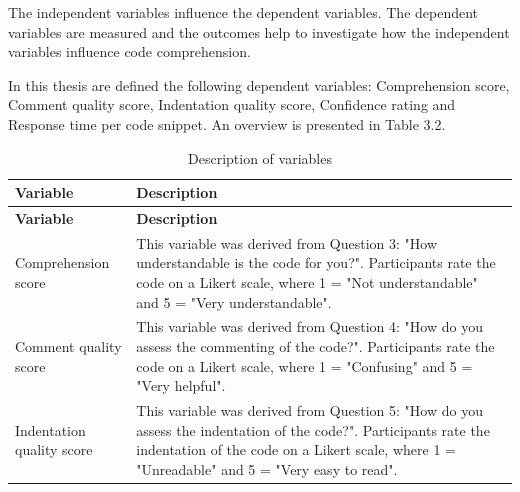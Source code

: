The independent variables influence the dependent variables. The dependent variables are measured and the outcomes help to investigate how the independent variables influence code comprehension.


In this thesis are defined the following dependent variables: Comprehension score, Comment quality score, Indentation quality score, Confidence rating and  Response time per code snippet. An overview is presented in Table 3.2.


\begin{longtable}{|p{5.5cm}|p{8.5cm}|}
\caption{Description of variables} \label{tab:variables} \\

\hline
\textbf{Variable} & \textbf{Description} \\
\hline
\endfirsthead

\hline
\textbf{Variable} & \textbf{Description} \\
\hline
\endhead

\hline
\parbox[t]{5.5cm}{\vspace{0.3em}Comprehension score\vspace{0.5em}} &
\parbox[t]{8.5cm}{\vspace{0.3em}This variable was derived from Question 3: "How understandable is the code for you?". Participants rate the code on a Likert scale, where 1 = "Not understandable" and 5 = "Very understandable".\vspace{0.5em}} \\
\hline

\parbox[t]{5.5cm}{\vspace{0.3em}Comment quality score\vspace{0.5em}} &
\parbox[t]{8.5cm}{\vspace{0.3em}This variable was derived from Question 4: "How do you assess the commenting of the code?". Participants rate the code on a Likert scale, where 1 = "Confusing" and 5 = "Very helpful".\vspace{0.5em}} \\
\hline

\parbox[t]{5.5cm}{\vspace{0.3em}Indentation quality score\vspace{0.5em}} &
\parbox[t]{8.5cm}{\vspace{0.3em}This variable was derived from Question 5: "How do you assess the indentation of the code?". Participants rate the indentation of the code on a Likert scale, where 1 = "Unreadable" and 5 = "Very easy to read".\vspace{0.5em}} \\
\hline


\end{longtable}

